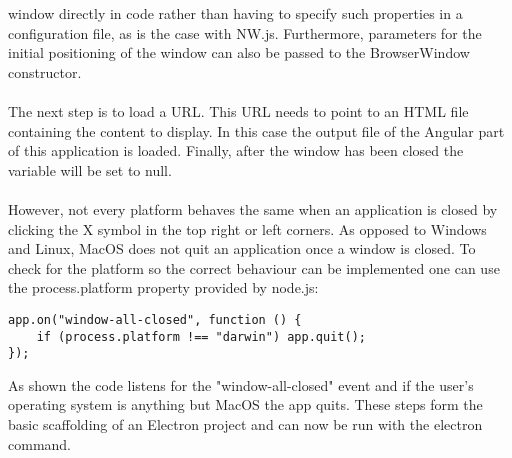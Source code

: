 window directly in code rather than having to specify such properties in a configuration file, as is 
the case with NW.js. \parencite{jensen2017}
Furthermore, parameters for the initial positioning of the window can also be passed to the BrowserWindow constructor.\paragraph{}
The next step is to load a URL.
This URL needs to point to an HTML file containing the content to display. 
In this case the output file of the Angular part of this application is loaded. 
Finally, after the window has been closed the variable will be set to null.\paragraph{}
However, not every platform behaves the same when an application is closed by clicking the X symbol in the top 
right or left corners. 
As opposed to Windows and Linux, MacOS does not quit an application once a window is closed. 
To check for the platform so the correct behaviour can be implemented one can use the process.platform \parencite{nodeDocs} property
provided by node.js:
\begin{lstlisting}[caption=Quitting and terminating an Electron application]
app.on("window-all-closed", function () {
    if (process.platform !== "darwin") app.quit();
});
\end{lstlisting}
As shown the code listens for the "window-all-closed" event and if the user's operating system is anything but MacOS 
the app quits. 
These steps form the basic scaffolding of an Electron project and can now be run with the electron command.